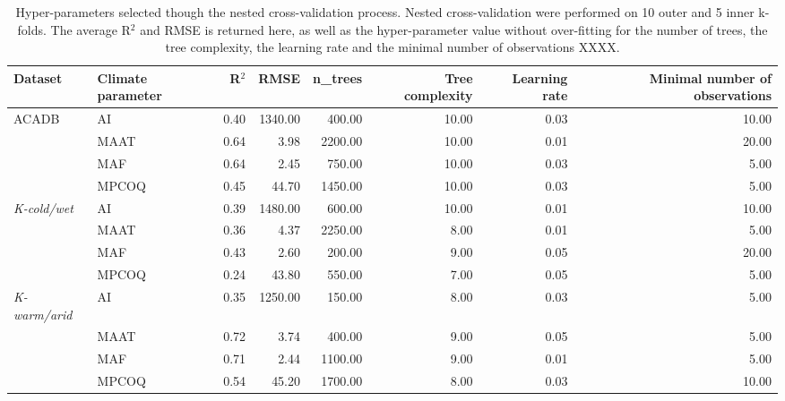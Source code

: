 \begin{table}[ht]
\centering
\caption{Hyper-parameters selected though the nested cross-validation process. Nested cross-validation were performed on 10 outer and 5 inner k-folds. The average R$^2$ and RMSE is returned here, as well as the hyper-parameter value without over-fitting for the number of trees, the tree complexity, the learning rate and the minimal number of observations XXXX.} 
\label{FT_table}
\begin{tabular}{llrrrrrr}
  \toprule
Dataset & Climate parameter & R$^2$ & RMSE & n_{trees} & Tree complexity & Learning rate & Minimal number of observations \\ 
  \midrule
ACADB & AI & 0.40 & 1340.00 & 400.00 & 10.00 & 0.03 & 10.00 \\ 
   & MAAT & 0.64 & 3.98 & 2200.00 & 10.00 & 0.01 & 20.00 \\ 
   & MAF & 0.64 & 2.45 & 750.00 & 10.00 & 0.03 & 5.00 \\ 
   & MPCOQ & 0.45 & 44.70 & 1450.00 & 10.00 & 0.03 & 5.00 \\ 
   \midrule
\textit{K-cold/wet} & AI & 0.39 & 1480.00 & 600.00 & 10.00 & 0.01 & 10.00 \\ 
   & MAAT & 0.36 & 4.37 & 2250.00 & 8.00 & 0.01 & 5.00 \\ 
   & MAF & 0.43 & 2.60 & 200.00 & 9.00 & 0.05 & 20.00 \\ 
   & MPCOQ & 0.24 & 43.80 & 550.00 & 7.00 & 0.05 & 5.00 \\ 
   \midrule
\textit{K-warm/arid} & AI & 0.35 & 1250.00 & 150.00 & 8.00 & 0.03 & 5.00 \\ 
   & MAAT & 0.72 & 3.74 & 400.00 & 9.00 & 0.05 & 5.00 \\ 
   & MAF & 0.71 & 2.44 & 1100.00 & 9.00 & 0.01 & 5.00 \\ 
   \midrule
 & MPCOQ & 0.54 & 45.20 & 1700.00 & 8.00 & 0.03 & 10.00 \\ 
   \bottomrule
\end{tabular}
\end{table}
